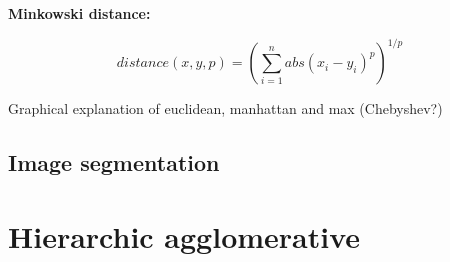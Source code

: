 \documentclass[]{book}
\theoremstyle{definition}
\theoremstyle{definition}
\theoremstyle{definition}
\theoremstyle{remark}
\begin{document}
\textbf{Minkowski distance:}

\begin{equation}
  distance\left(x,y,p\right)=\left(\sum_{i=1}^{n} abs(x_i-y_i)^p\right)^{1/p}
  \label{eq:minkowski}
\end{equation}

Graphical explanation of euclidean, manhattan and max (Chebyshev?)

\subsection{Image segmentation}\label{image-segmentation}

\section{Hierarchic agglomerative}\label{hierarchic-agglomerative}
\end{document}
